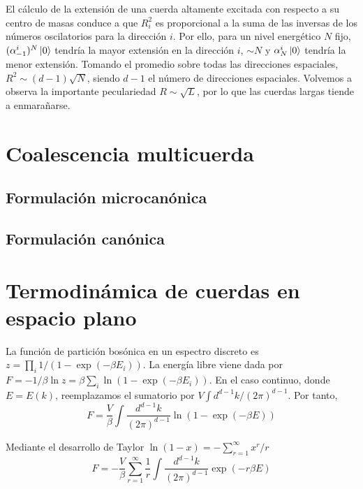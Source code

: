 El cálculo de la extensión de una cuerda altamente excitada con respecto a su centro de masas 
conduce a que $R^2_i$ es proporcional a la suma de las inversas de los números oscilatorios para
la dirección $i$.
Por ello, para un nivel energético $N$ fijo, $(\alpha^i_{-1})^N\ket{0}$ tendría la mayor extensión en la dirección $i$, $\sim N$ y
$\alpha^i_N\ket{0}$ tendría la menor extensión.
Tomando el promedio sobre todas las direcciones espaciales, $R^2\sim (d-1)\sqrt{N}$, siendo
$d-1$ el número de direcciones espaciales. Volvemos a  observa la importante peculariedad $R\sim \sqrt{L}$,
por lo que las cuerdas largas tiende a enmarañarse.

\section{Coalescencia multicuerda}


\subsection{Formulación microcanónica}


\subsection{Formulación canónica}

\section{Termodinámica de cuerdas en espacio plano}


La función de partición bosónica en un espectro discreto es $z=\prod_i 1/(1-\exp(-\beta E_i))$.
La energía libre viene dada por $F=-1/\beta \ln z=\beta\sum_i \ln(1-\exp(-\beta E_i))$.
En el caso continuo, donde $E=E(k)$, reemplazamos el sumatorio por $V\int d^{d-1}k/(2\pi)^{d-1}$.
Por tanto,
\begin{equation}
  F=\frac{V}{\beta}\int \frac{d^{d-1}k}{(2\pi)^{d-1}}\ln(1-\exp(-\beta E))
\end{equation}

Mediante el desarrollo de Taylor $\ln(1-x)=-\sum^\infty_{r=1} x^r/r$
\begin{equation}
  F=-\frac{V}{\beta}\sum^\infty_{r=1} \frac 1 r\int \frac{d^{d-1}k}{(2\pi)^{d-1}}\exp(-r\beta E)
\end{equation}

